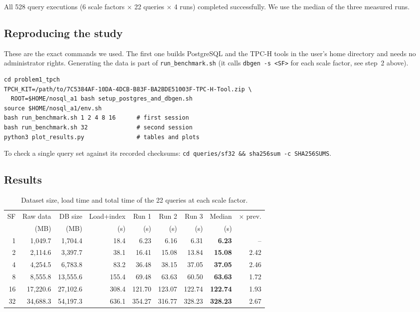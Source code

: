 \documentclass[11pt,a4paper]{article}
\newcommand{\file}[1]{\texttt{#1}}
\begin{document}
All 528 query executions (6 scale factors $\times$ 22 queries $\times$ 4 runs)
completed successfully. We use the median of the three measured runs.

\subsection{Reproducing the study}

These are the exact commands we used. The first one builds PostgreSQL and the
TPC-H tools in the user's home directory and needs no administrator rights.
Generating the data is part of \file{run\_benchmark.sh} (it calls
\file{dbgen -s <SF>} for each scale factor, see step~2 above).

\begin{lstlisting}
cd problem1_tpch
TPCH_KIT=/path/to/7C5384AF-10DA-4DCB-B83F-BA2BDE51003F-TPC-H-Tool.zip \
  ROOT=$HOME/nosql_a1 bash setup_postgres_and_dbgen.sh
source $HOME/nosql_a1/env.sh
bash run_benchmark.sh 1 2 4 8 16      # first session
bash run_benchmark.sh 32              # second session
python3 plot_results.py               # tables and plots
\end{lstlisting}

To check a single query set against its recorded checksums:
\file{cd queries/sf32 \&\& sha256sum -c SHA256SUMS}.

\subsection{Results}

\begin{table}[H]
\centering
\small
\begin{tabular}{@{}rrrrrrrrr@{}}
\toprule
SF & Raw data & DB size & Load+index & Run 1 & Run 2 & Run 3 & Median & $\times$ prev. \\
   & (MB) & (MB) & (s) & (s) & (s) & (s) & (s) & \\
\midrule
1  & 1{,}049.7  & 1{,}704.4  & 18.4  & 6.23   & 6.16   & 6.31   & \textbf{6.23}   & -- \\
2  & 2{,}114.6  & 3{,}397.7  & 38.1  & 16.41  & 15.08  & 13.84  & \textbf{15.08}  & 2.42 \\
4  & 4{,}254.5  & 6{,}783.8  & 83.2  & 36.48  & 38.15  & 37.05  & \textbf{37.05}  & 2.46 \\
8  & 8{,}555.8  & 13{,}555.6 & 155.4 & 69.48  & 63.63  & 60.50  & \textbf{63.63}  & 1.72 \\
16 & 17{,}220.6 & 27{,}102.6 & 308.4 & 121.70 & 123.07 & 122.74 & \textbf{122.74} & 1.93 \\
32 & 34{,}688.3 & 54{,}197.3 & 636.1 & 354.27 & 316.77 & 328.23 & \textbf{328.23} & 2.67 \\
\bottomrule
\end{tabular}
\caption{Dataset size, load time and total time of the 22 queries at each scale factor.}
\label{tab:totals}
\end{table}
\end{document}
